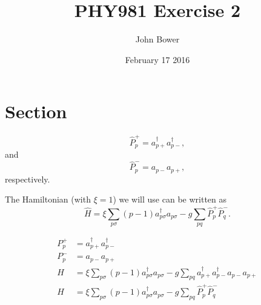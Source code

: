 \documentclass[11 pt, a4paper]{article}
\title{PHY981 Exercise 2}
\author{John Bower}
\date{February 17 2016}
\begin{document}
\maketitle

\section{Section}
\[
\hat{P}^{+}_p = a^\dag_{p+}a^\dag_{p-},
\]
and
\[
\hat{P}^{-}_p = a_{p-}a_{p+},
\] 
respectively.

The Hamiltonian (with $\xi=1$) we will use can be written as
\[
\hat{H}=\xi\sum_{p\sigma}(p-1)a_{p\sigma}^{\dagger}a_{p\sigma}
-g\sum_{pq}\hat{P}^{+}_p\hat{P}^{-}_q.
\]

\begin{align*}

P^{+}_p &= a^\dag_{p+}a^\dag_{p-} \\

P^{-}_p &= a_{p-}a_{p+} \\


H&=\xi\sum_{p\sigma}(p-1)a_{p\sigma}^{\dagger}a_{p\sigma}
-g\sum_{pq}a^\dag_{p+}a^\dag_{p-}a_{p-}a_{p+} \\




H&=\xi\sum_{p\sigma}(p-1)a_{p\sigma}^{\dagger}a_{p\sigma}
-g\sum_{pq}\hat{P}^{+}_p\hat{P}^{-}_q

\end{align*}
\end{document}
